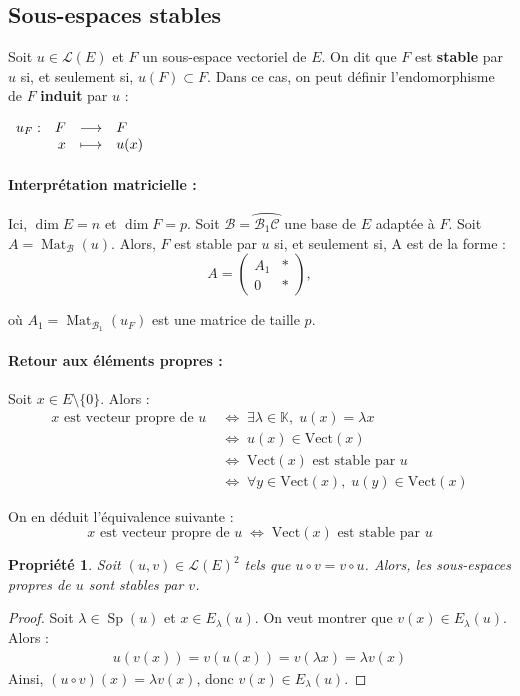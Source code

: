 \documentclass[12pt]{book}
\let\ensembleNombre\mathbb
\newcommand*\K{\ensuremath{\ensembleNombre{K}}}
\newcommand{\app}[5]{\ensuremath{
\begin{array}[t]{lrcl}
#1 : & #2 & \longrightarrow & #3 \\
    & #4 & \longmapsto & #5 \end{array}
}}
\DeclareMathOperator{\Sp}{Sp}
\DeclareMathOperator{\Mat}{Mat}
\newtheorem*{prop}{Propriété}
\theoremstyle{definition}
\theoremstyle{remark}
\begin{document}
	\subsection{Sous-espaces stables}
	
	Soit $u \in \mathcal L(E)$ et $F$ un sous-espace vectoriel de $E$. On dit que $F$ est \textbf{stable} par $u$ si, et seulement si, $u(F) \subset F$. Dans ce cas, on peut définir l'endomorphisme de $F$ \textbf{induit} par $u$ :	
	\begin{center}
	$\app{u_F}{F}{F}{x}{u(x)}$
	\end{center}
	
	\paragraph{Interprétation matricielle : } Ici, $\dim E = n$ et $\dim F = p$. Soit $\mathcal B = \wideparen{\mathcal B_1 \mathcal C}$ une base de $E$ adaptée à $F$. Soit $A = \Mat_{\mathcal B} (u)$. Alors, $F$ est stable par $u$ si, et seulement si, A est de la forme :
	\[A = \begin{pmatrix}
	A_1 & * \\
	0 & *
	\end{pmatrix},\]
	
	où $A_1 = \Mat_{\mathcal B_1} (u_F)$ est une matrice de taille $p$.
	
	\paragraph{Retour aux éléments propres : } Soit $x \in E \setminus \lbrace 0 \rbrace$. Alors :
	\begin{align*}
	x \text{ est vecteur propre de } u \;&\Longleftrightarrow \;\exists \lambda \in \K, \; u(x) = \lambda x \\
	&\Longleftrightarrow \; u(x) \in \mathrm{Vect}(x) \\
	&\Longleftrightarrow \; \mathrm{Vect}(x) \text{ est stable par } u \\
	&\Longleftrightarrow \; \forall y \in \mathrm{Vect}(x), \; u(y) \in \mathrm{Vect}(x)
	\end{align*}

	On en déduit l'équivalence suivante : 	
	\[ \boxed{ x \text{ est vecteur propre de } u \;\Longleftrightarrow\; \mathrm{Vect}(x) \text{ est stable par } u } \]
	
	\begin{prop}
	Soit $(u,v) \in \mathcal L(E)^2$ tels que $u \circ v = v \circ u$. Alors, les sous-espaces propres de $u$ sont stables par $v$.
	\end{prop}
	\begin{proof}
	Soit $\lambda \in \Sp(u)$ et $x \in E_\lambda(u)$. On veut montrer que $v(x) \in E_\lambda(u)$. Alors :
	\begin{align*}
	u(v(x)) = v(u(x)) = v(\lambda x) = \lambda v(x)
	\end{align*}
	Ainsi, $(u \circ v)(x) = \lambda v(x)$, donc $v(x) \in E_\lambda(u)$.
	\end{proof}
	
\end{document}
